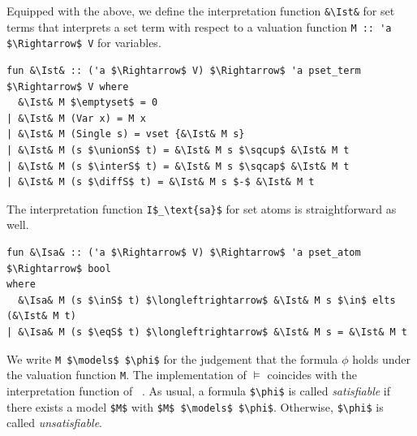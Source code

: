 \documentclass[
  sigplan,
  10pt,
  ]{acmart}
\newcommand{\unionS}{\sqcup_\text{s}}
\newcommand{\interS}{\sqcap_\text{s}}
\newcommand{\diffS}{-_\text{s}}
\newcommand{\inS}{\in_\text{s}}
\newcommand{\eqS}{=_\text{s}}
\newcommand{\Ist}{I$_\text{st}$}
\newcommand{\Isa}{I$_\text{sa}$}
\begin{document}
Equipped with the above, we define the interpretation function \lstinline!&\Ist&! for set terms that interprets a set term with respect to a valuation function \lstinline!M :: 'a $\Rightarrow$ V! for variables.
\begin{lstlisting}
fun &\Ist& :: ('a $\Rightarrow$ V) $\Rightarrow$ 'a pset_term $\Rightarrow$ V where
  &\Ist& M $\emptyset$ = 0
| &\Ist& M (Var x) = M x
| &\Ist& M (Single s) = vset {&\Ist& M s}
| &\Ist& M (s $\unionS$ t) = &\Ist& M s $\sqcup$ &\Ist& M t 
| &\Ist& M (s $\interS$ t) = &\Ist& M s $\sqcap$ &\Ist& M t 
| &\Ist& M (s $\diffS$ t) = &\Ist& M s $-$ &\Ist& M t 
\end{lstlisting}
The interpretation function \lstinline!I$_\text{sa}$! for set atoms is straightforward as well.
\begin{lstlisting}
fun &\Isa& :: ('a $\Rightarrow$ V) $\Rightarrow$ 'a pset_atom $\Rightarrow$ bool
where
  &\Isa& M (s $\inS$ t) $\longleftrightarrow$ &\Ist& M s $\in$ elts (&\Ist& M t)
| &\Isa& M (s $\eqS$ t) $\longleftrightarrow$ &\Ist& M s = &\Ist& M t
\end{lstlisting}

We write \lstinline!M $\models$ $\phi$! for the judgement that the formula $\phi$ holds under the valuation function \lstinline!M!.
The implementation of $\models$ coincides with the interpretation function of \citeauthor{lqe}~\cite{lqe}.
As usual, a formula \lstinline!$\phi$! is called \textit{satisfiable} if there exists a model \lstinline!$M$! with \lstinline!$M$ $\models$ $\phi$!.
Otherwise, \lstinline!$\phi$! is called \textit{unsatisfiable}.
\end{document}
